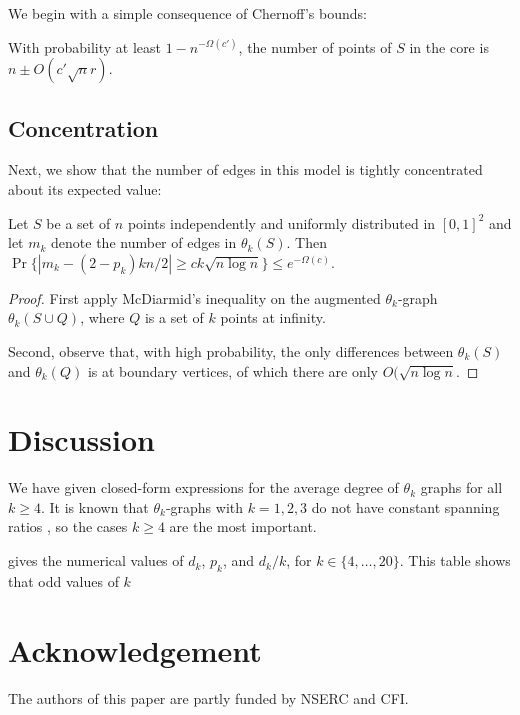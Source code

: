 \documentclass{patmorin}
\begin{document}
We begin with a simple consequence of
Chernoff's bounds:

\begin{lem}
  With probability at least $1-n^{-\Omega(c')}$, the number of points
  of $S$ in the core is $n\pm O(c'\sqrt{n}r)$.
\end{lem}

\subsection{Concentration}

Next, we show that the number of edges in this model is tightly concentrated about its expected value:

\begin{lem}
 Let $S$ be a set of $n$ points independently and uniformly distributed
 in $[0,1]^2$ and let $m_k$ denote the number of edges in $\theta_k(S)$.
 Then $\Pr\{|m_k-(2-p_k)kn/2| \ge ck\sqrt{n\log n}\} \le e^{-\Omega(c)}$.
\end{lem}

\begin{proof}
First apply McDiarmid's inequality on the augmented $\theta_k$-graph
$\theta_k(S\cup Q)$, where $Q$ is a set of $k$ points at infinity.

Second, observe that, with high probability, the only differences between
$\theta_k(S)$ and $\theta_k(Q)$ is at boundary vertices, of which there
are only $O(\sqrt{n\log n}$.
\end{proof}





\section{Discussion}

We have given closed-form expressions for the average degree of $\theta_k$
graphs for all $k\ge 4$.  It is known that $\theta_k$-graphs with
$k=1,2,3$ do not have constant spanning ratios \cite{S}, so the cases
$k\ge 4$ are the most important.

 gives the numerical values of $d_k$, $p_k$, and $d_k/k$,
for $k\in\{4,\ldots,20\}$.  This table shows that odd values of $k$

\section*{Acknowledgement}

The authors of this paper are partly funded by NSERC and CFI.



\end{document}
